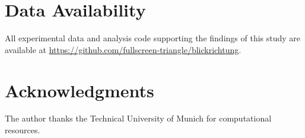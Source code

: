 \documentclass[aps,prl,twocolumn,superscriptaddress,showpacs]{revtex4-2}
\begin{document}
\section*{Data Availability}

All experimental data and analysis code supporting the findings of this study are available at \url{https://github.com/fullscreen-triangle/blickrichtung}.

\section*{Acknowledgments}

The author thanks the Technical University of Munich for computational resources.


\end{document}
